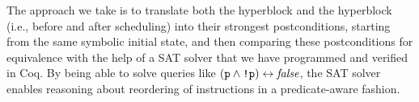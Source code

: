 The approach we take is to translate both the \rtlblock{} hyperblock and the
\rtlpar{} hyperblock (i.e., before and after scheduling) into their strongest
postconditions, starting from the same symbolic initial state, and then
comparing these postconditions for equivalence with the help of a SAT solver
that we have programmed and verified in Coq. By being able to solve queries like
$(\texttt{p} \land \texttt{!p}) \leftrightarrow \mathit{false}$, the SAT solver enables
reasoning about reordering of instructions in a predicate-aware fashion.



